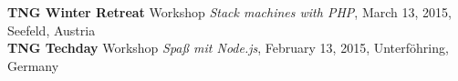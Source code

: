 \documentclass[10pt]{article}
\begin{document}
  \textbf{TNG Winter Retreat} Workshop \textit{Stack machines with PHP}, March 13, 2015, Seefeld, Austria\\

  \textbf{TNG Techday} Workshop \textit{Spa{\ss} mit Node.js}, February 13, 2015, Unterf\"ohring, Germany\\









\end{document}
